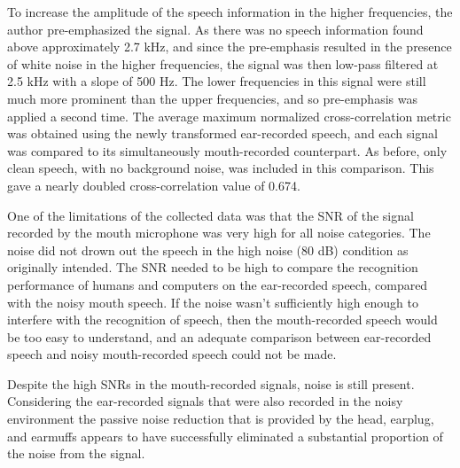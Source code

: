To increase the amplitude of the speech information in the higher frequencies, the author pre-emphasized the signal.  As there was no speech information found above approximately 2.7 kHz, and since the pre-emphasis resulted in the presence of white noise in the higher frequencies, the signal was then low-pass filtered at 2.5 kHz with a slope of 500 Hz.  The lower frequencies in this signal were still much more prominent than the upper frequencies, and so pre-emphasis was applied a second time.  The average maximum normalized cross-correlation metric was obtained using the newly transformed ear-recorded speech, and each signal was compared to its simultaneously mouth-recorded counterpart.  As before, only clean speech, with no background noise, was included in this comparison.  This gave a nearly doubled cross-correlation value of 0.674.


One of the limitations of the collected data was that the SNR of the signal recorded by the mouth microphone was very high for all noise categories.  The noise did not drown out the speech in the high noise (80 dB) condition as originally intended.  The SNR needed to be high to compare the recognition performance of humans and computers on the ear-recorded speech, compared with the noisy mouth speech.  If the noise wasn't sufficiently high enough to interfere with the recognition of speech, then the mouth-recorded speech would be too easy to understand, and an adequate comparison between ear-recorded speech and noisy mouth-recorded speech could not be made.

Despite the high SNRs in the mouth-recorded signals, noise is still present.  Considering the ear-recorded signals that were also recorded in the noisy environment %
the passive noise reduction that is provided by the head, earplug, and earmuffs appears to have successfully eliminated a substantial proportion of the noise from the signal.

